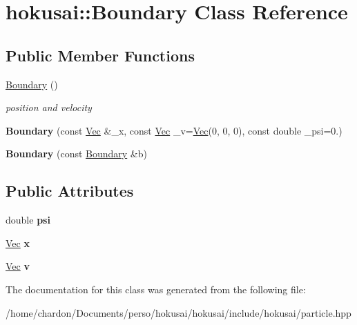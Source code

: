 \hypertarget{classhokusai_1_1Boundary}{\section{hokusai\+:\+:Boundary Class Reference}
\label{classhokusai_1_1Boundary}
}
\subsection*{Public Member Functions}
\begin{DoxyCompactItemize}
\item 
\hypertarget{classhokusai_1_1Boundary_ac715de49720c7a7ecc7321783d9a905c}{\hyperlink{classhokusai_1_1Boundary_ac715de49720c7a7ecc7321783d9a905c}{Boundary} ()}\label{classhokusai_1_1Boundary_ac715de49720c7a7ecc7321783d9a905c}

\begin{DoxyCompactList}\small\item\em position and velocity \end{DoxyCompactList}\item 
\hypertarget{classhokusai_1_1Boundary_a15ae90ff39d11ad2f6b8383b8ed5c18f}{{\bfseries Boundary} (const \hyperlink{classhokusai_1_1Vec3}{Vec} \&\+\_\+x, const \hyperlink{classhokusai_1_1Vec3}{Vec} \+\_\+v=\hyperlink{classhokusai_1_1Vec3}{Vec}(0, 0, 0), const double \+\_\+psi=0.)}\label{classhokusai_1_1Boundary_a15ae90ff39d11ad2f6b8383b8ed5c18f}

\item 
\hypertarget{classhokusai_1_1Boundary_a6ade75af028b47a31bb1d035c5c4214b}{{\bfseries Boundary} (const \hyperlink{classhokusai_1_1Boundary}{Boundary} \&b)}\label{classhokusai_1_1Boundary_a6ade75af028b47a31bb1d035c5c4214b}

\end{DoxyCompactItemize}
\subsection*{Public Attributes}
\begin{DoxyCompactItemize}
\item 
\hypertarget{classhokusai_1_1Boundary_ae4ff8be85c7fbe3131b32e06cf4991ec}{double {\bfseries psi}}\label{classhokusai_1_1Boundary_ae4ff8be85c7fbe3131b32e06cf4991ec}

\item 
\hypertarget{classhokusai_1_1Boundary_a24cc9c5b152b1f802fa39ba9a439e9e5}{\hyperlink{classhokusai_1_1Vec3}{Vec} {\bfseries x}}\label{classhokusai_1_1Boundary_a24cc9c5b152b1f802fa39ba9a439e9e5}

\item 
\hypertarget{classhokusai_1_1Boundary_aa1ca1b313a4ed5ac96eb79b0c4f4af89}{\hyperlink{classhokusai_1_1Vec3}{Vec} {\bfseries v}}\label{classhokusai_1_1Boundary_aa1ca1b313a4ed5ac96eb79b0c4f4af89}

\end{DoxyCompactItemize}


The documentation for this class was generated from the following file\+:\begin{DoxyCompactItemize}
\item 
/home/chardon/\+Documents/perso/hokusai/hokusai/include/hokusai/particle.\+hpp\end{DoxyCompactItemize}
